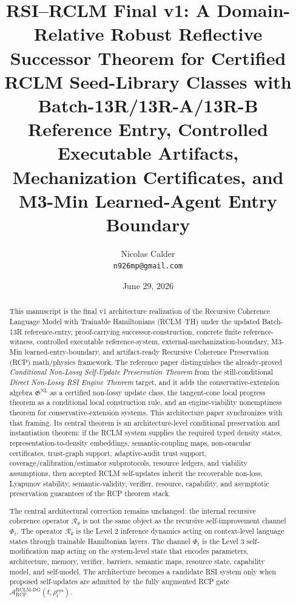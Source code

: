 \documentclass[11pt,a4paper]{article}
\title{RSI--RCLM Final v1: A Domain-Relative Robust Reflective Successor Theorem for Certified RCLM Seed-Library Classes with Batch-13R/13R-A/13R-B Reference Entry, Controlled Executable Artifacts, Mechanization Certificates, and M3-Min Learned-Agent Entry Boundary}
\author{Nicolas Calder\\[0.25em]\small\texttt{n926mp@gmail.com}}
\date{June 29, 2026}
\newcommand{\Acal}{\mathcal A}
\newcommand{\Rcal}{\mathcal R}
\newcommand{\RCP}{\mathrm{RCP}}
\newcommand{\RCLM}{\mathrm{RCLM}}
\newcommand{\DG}{\mathrm{DG}}
\newcommand{\sys}{\mathrm{sys}}
\begin{document}
\maketitle

\begin{abstract}
This manuscript is the final v1 architecture realization of the Recursive Coherence Language Model with Trainable Hamiltonians (RCLM--TH) under the updated Batch-13R reference-entry, proof-carrying successor-construction, concrete finite reference-witness, controlled executable reference-system, external-mechanization-boundary, M3-Min learned-entry-boundary, and artifact-ready Recursive Coherence Preservation (RCP) math/physics framework.  The reference paper distinguishes the already-proved \emph{Conditional Non-Lossy Self-Update Preservation Theorem} from the still-conditional \emph{Direct Non-Lossy RSI Engine Theorem} target, and it adds the conservative-extension algebra \(\mathfrak G^{\mathrm{NL}}\) as a certified non-lossy update class, the tangent-cone local progress theorem as a conditional local construction rule, and an engine-viability nonemptiness theorem for conservative-extension systems.  This architecture paper synchronizes with that framing.  Its central theorem is an architecture-level conditional preservation and instantiation theorem: if the RCLM system supplies the required typed density states, representation-to-density embeddings, semantic-coupling maps, non-oracular certificates, trust-graph support, adaptive-audit trust support, coverage/calibration/estimator subprotocols, resource ledgers, and viability assumptions, then accepted RCLM self-updates inherit the recoverable non-loss, Lyapunov stability, semantic-validity, verifier, resource, capability, and asymptotic preservation guarantees of the RCP theorem stack.

The central architectural correction remains unchanged: the internal recursive coherence operator \(\Rcal_{\theta}\) is not the same object as the recursive self-improvement channel \(\Phi_t\).  The operator \(\Rcal_{\theta}\) is the Level 2 inference dynamics acting on context-level language states through trainable Hamiltonian layers.  The channel \(\Phi_t\) is the Level 3 self-modification map acting on the system-level state that encodes parameters, architecture, memory, verifier, barriers, semantic maps, resource state, capability model, and self-model.  The architecture becomes a candidate RSI system only when proposed self-updates are admitted by the fully augmented RCP gate \(\Acal_{\RCP}^{\RCLM\text{-}\DG}(t,\rho_t^{\sys})\).


\end{abstract}
\end{document}
